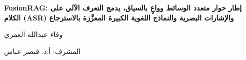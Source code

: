\documentclass[12pt,a4paper,oneside]{report}
\begin{document}

\begin{center}

{\Large\bfseries
FusionRAG: إطار حوار متعدد الوسائط وواعٍ بالسياق، يدمج التعرف الآلي على الكلام
(ASR) والإشارات البصرية والنماذج اللغوية الكبيرة المعزَّزة بالاسترجاع
}

\vspace{0.3cm}

{\large
وفاء عبدالله العمري
}

\vspace{0.2cm}

{\normalsize
المشرف: أ.د. قيصر عباس
}



\end{center}

\vspace{0.1cm}

\end{document}
